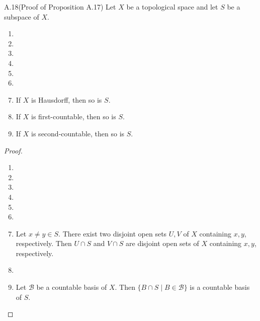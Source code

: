 \begin{customexer}{A.18(Proof of Proposition A.17)}\label{exercise_a_18}
  Let $X$ be a topological space and let $S$ be a subspace of $X$.
  \begin{enumerate}[label=(\alph*)]
    \item 
    \item 
    \item 
    \item 
    \item 
    \item 
    \item 
      If $X$ is Hausdorff, then so is $S$.
    \item 
      If $X$ is first-countable, then so is $S$.
    \item 
      If $X$ is second-countable, then so is $S$.
  \end{enumerate}
\end{customexer}

\begin{proof}
  $ $
  \begin{enumerate}[label=(\alph*)]
    \item 
    \item 
    \item 
    \item 
    \item 
    \item 
    \item 
      Let $x \ne y \in S$.
      There exist two disjoint open sets $U, V$ of $X$ containing $x, y$, respectively.
      Then $U \cap S$ and $V \cap S$ are disjoint open sets of $X$ containing $x, y$, respectively.
    \item 
    \item 
      Let $\mathcal{B}$ be a countable basis of $X$.
      Then $\{ B \cap S \mid B \in \mathcal{B} \}$ is a countable basis of $S$.
  \end{enumerate}
\end{proof}
